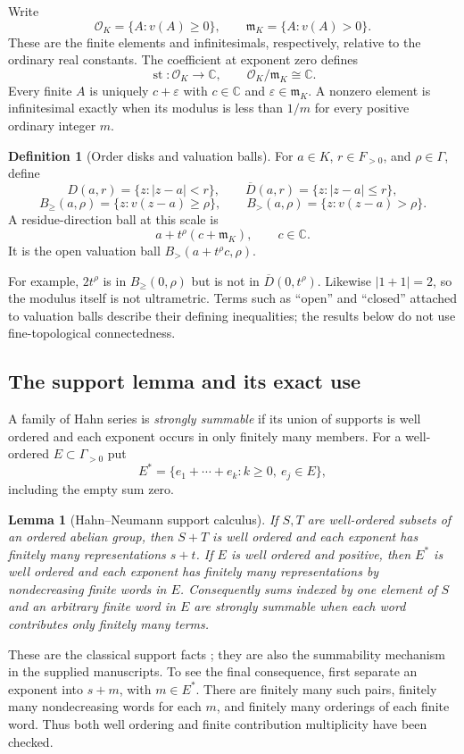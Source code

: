 \documentclass[11pt,letterpaper]{article}
\numberwithin{equation}{section}
\newtheorem{lemma}[theorem]{Lemma}
\theoremstyle{definition}
\newtheorem{definition}[theorem]{Definition}
\theoremstyle{remark}\newtheorem{remark}[theorem]{Remark}
\newcommand{\C}{\mathbb C}
\newcommand{\OO}{\mathcal O}
\newcommand{\mm}{\mathfrak m}
\newcommand{\st}{\operatorname{st}}
\newcommand{\Bge}[2]{B_{\ge}(#1,#2)}
\newcommand{\Bgt}[2]{B_{>}(#1,#2)}
\begin{document}
Write
\[
 \OO_K=\{A:v(A)\ge0\},\qquad \mm_K=\{A:v(A)>0\}.
\]
These are the finite elements and infinitesimals, respectively, relative
to the ordinary real constants. The coefficient at exponent zero defines
\[
 \st:\OO_K\longrightarrow\C,\qquad
 \OO_K/\mm_K\cong\C.
\]
Every finite $A$ is uniquely $c+\varepsilon$ with $c\in\C$ and
$\varepsilon\in\mm_K$. A nonzero element is infinitesimal exactly when
its modulus is less than $1/m$ for every positive ordinary integer $m$.

\begin{definition}[Order disks and valuation balls]\label{def:balls}
For $a\in K$, $r\in F_{>0}$, and $\rho\in\Gamma$, define
\[
 D(a,r)=\{z:|z-a|<r\},\qquad
 \overline D(a,r)=\{z:|z-a|\le r\},
\]
\[
 \Bge a\rho=\{z:v(z-a)\ge\rho\},\qquad
 \Bgt a\rho=\{z:v(z-a)>\rho\}.
\]
A residue-direction ball at this scale is
\[
 a+t^\rho(c+\mm_K),\qquad c\in\C.
\]
It is the open valuation ball $\Bgt{a+t^\rho c}{\rho}$.
\end{definition}
For example, $2t^\rho$ is in $\Bge0\rho$ but is not in
$\overline D(0,t^\rho)$. Likewise $|1+1|=2$, so the modulus itself is
not ultrametric. Terms such as ``open'' and ``closed'' attached to valuation
balls describe their defining inequalities; the results below do not use
fine-topological connectedness.

\subsection{The support lemma and its exact use}
A family of Hahn series is \emph{strongly summable} if its union of supports
is well ordered and each exponent occurs in only finitely many members.
For a well-ordered $E\subset\Gamma_{>0}$ put
\[
 E^*=\{e_1+\cdots+e_k:k\ge0,\ e_j\in E\},
\]
including the empty sum zero.

\begin{lemma}[Hahn--Neumann support calculus]\label{lem:support}
If $S,T$ are well-ordered subsets of an ordered abelian group, then $S+T$
is well ordered and each exponent has finitely many representations $s+t$.
If $E$ is well ordered and positive, then $E^*$ is well ordered and each
exponent has finitely many representations by nondecreasing finite words
in $E$. Consequently sums indexed by one element of $S$ and an arbitrary
finite word in $E$ are strongly summable when each word contributes only
finitely many terms.
\end{lemma}
These are the classical support facts \cite{Neumann}; they are also the
summability mechanism in the supplied manuscripts. To see the final
consequence, first separate an exponent into $s+m$, with $m\in E^*$.
There are finitely many such pairs, finitely many nondecreasing words for
each $m$, and finitely many orderings of each finite word. Thus both well
ordering and finite contribution multiplicity have been checked.
\end{document}
